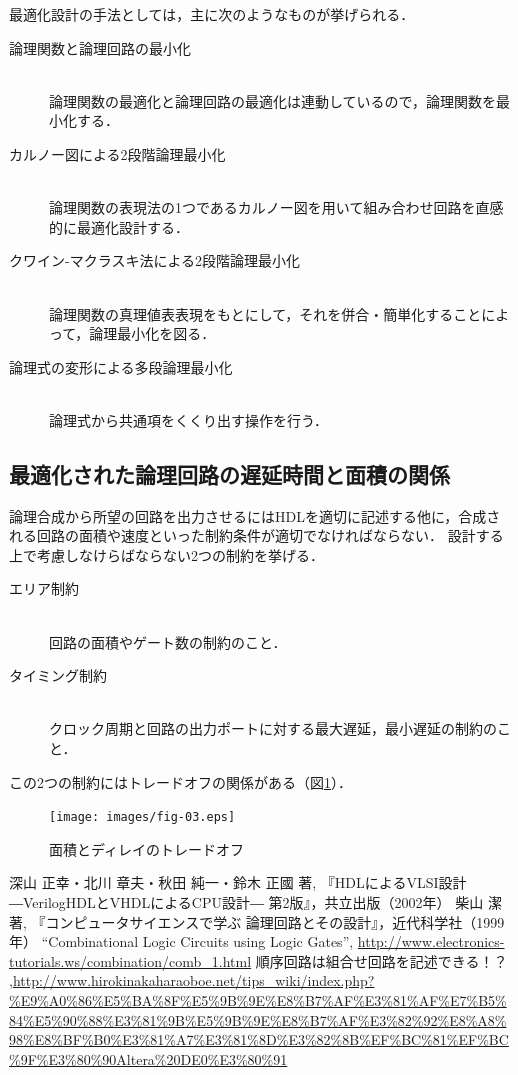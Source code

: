 \documentclass[uplatex]{jsarticle}
\begin{document}
最適化設計の手法としては，主に次のようなものが挙げられる．

\begin{description}
 \item[論理関数と論理回路の最小化]\mbox{}\\ 
  論理関数の最適化と論理回路の最適化は連動しているので，論理関数を最小化する．
 \item[カルノー図による2段階論理最小化]\mbox{}\\
  論理関数の表現法の1つであるカルノー図を用いて組み合わせ回路を直感的に最適化設計する．
 \item[クワイン-マクラスキ法による2段階論理最小化]\mbox{}\\
  論理関数の真理値表表現をもとにして，それを併合・簡単化することによって，論理最小化を図る．
 \item[論理式の変形による多段論理最小化]\mbox{}\\
  論理式から共通項をくくり出す操作を行う．
\end{description}

\subsection{最適化された論理回路の遅延時間と面積の関係}

論理合成から所望の回路を出力させるにはHDLを適切に記述する他に，合成される回路の面積や速度といった制約条件が適切でなければならない．
設計する上で考慮しなけらばならない2つの制約を挙げる．

\begin{description}
 \item[エリア制約]\mbox{}\\ 
   回路の面積やゲート数の制約のこと．
 \item[タイミング制約]\mbox{}\\
  クロック周期と回路の出力ポートに対する最大遅延，最小遅延の制約のこと．
\end{description}

この2つの制約にはトレードオフの関係がある（図\ref{fig:03}）．

\begin{figure}[htb]
  \begin{center}
    \texttt{[image: images/fig-03.eps]}
    \caption{面積とディレイのトレードオフ}
    \label{fig:03}
  \end{center}
\end{figure}

\begin{thebibliography}{99}
 深山 正幸・北川 章夫・秋田 純一・鈴木 正國 著, 『HDLによるVLSI設計―VerilogHDLとVHDLによるCPU設計― 第2版』，共立出版（2002年）
 柴山 潔 著, 『コンピュータサイエンスで学ぶ 論理回路とその設計』，近代科学社（1999年）
 ``Combinational Logic Circuits using Logic Gates'', \url{http://www.electronics-tutorials.ws/combination/comb_1.html}
 順序回路は組合せ回路を記述できる！？ ,\url{http://www.hirokinakaharaoboe.net/tips_wiki/index.php?%E9%A0%86%E5%BA%8F%E5%9B%9E%E8%B7%AF%E3%81%AF%E7%B5%84%E5%90%88%E3%81%9B%E5%9B%9E%E8%B7%AF%E3%82%92%E8%A8%98%E8%BF%B0%E3%81%A7%E3%81%8D%E3%82%8B%EF%BC%81%EF%BC%9F%E3%80%90Altera%20DE0%E3%80%91}
\end{thebibliography}

\clearpage

\appendix
\end{document}
